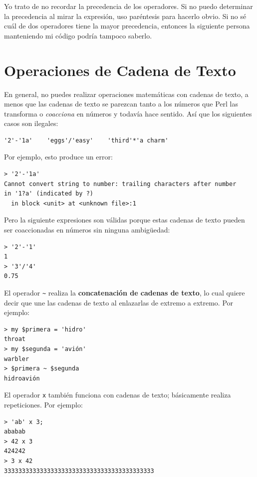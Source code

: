 Yo trato de no recordar la precedencia de los operadores. Si no puedo 
determinar la precedencia al mirar la expresión, uso paréntesis para
hacerlo obvio. Si no sé cuál de dos operadores tiene la mayor precedencia, entonces 
la siguiente persona manteniendo mi código podría tampoco saberlo.


\section{Operaciones de Cadena de Texto}
\label{string_operations}

En general, no puedes realizar operaciones matemáticas con cadenas de texto,
a menos que las cadenas de texto se parezcan tanto a los números que 
Perl las transforma o \emph{coacciona} en números y todavía hace sentido.
Así que los siguientes casos son ilegales:

\begin{lstlisting}
'2'-'1a'    'eggs'/'easy'    'third'*'a charm'
\end{lstlisting}
%

Por ejemplo, esto produce un error:

\begin{lstlisting}
> '2'-'1a'
Cannot convert string to number: trailing characters after number 
in '1?a' (indicated by ?)
  in block <unit> at <unknown file>:1
\end{lstlisting}
%

Pero la siguiente expresiones son válidas porque estas cadenas de texto
pueden ser coaccionadas en números sin ninguna ambigüedad:
\begin{lstlisting}
> '2'-'1'
1
> '3'/'4'
0.75
\end{lstlisting}
%

El operador \verb'~' realiza la {\bf concatenación de cadenas de texto}, 
lo cual quiere decir que une las cadenas de texto al enlazarlas de
extremo a extremo. Por ejemplo:

\begin{lstlisting}
> my $primera = 'hidro'
throat
> my $segunda = 'avión'
warbler
> $primera ~ $segunda
hidroavión
\end{lstlisting}
%
El operador {\tt x} también funciona con cadenas de texto; básicamente
realiza repeticiones. Por ejemplo:

\begin{lstlisting}
> 'ab' x 3;
ababab
> 42 x 3
424242
> 3 x 42
333333333333333333333333333333333333333333
\end{lstlisting}

